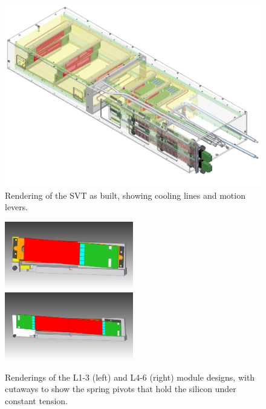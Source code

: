 \begin{figure}[ht]
    \includegraphics[width=\textwidth]{detector/figs/svt_drawing}
    \caption{Rendering of the SVT as built, showing cooling lines and motion levers.}
    \label{fig:svt-drawing}
\end{figure}

\begin{figure}[ht]
    \includegraphics[width=0.5\textwidth]{detector/figs/svt_l123_drawing}
    \includegraphics[width=0.5\textwidth]{detector/figs/svt_l456_drawing}
    \caption{Renderings of the L1-3 (left) and L4-6 (right) module designs, with cutaways to show the spring pivots that hold the silicon under constant tension.}
    \label{fig:svt-module-drawing}
\end{figure}

